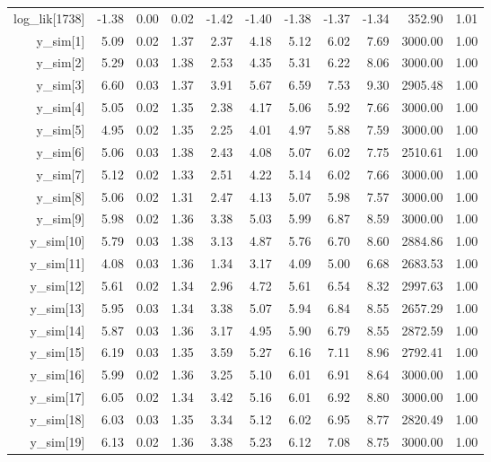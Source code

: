 \begin{table}[ht]
\begin{tabular}{rrrrrrrrrrr}
  log\_lik[1738] & -1.38 & 0.00 & 0.02 & -1.42 & -1.40 & -1.38 & -1.37 & -1.34 & 352.90 & 1.01 \\ 
  y\_sim[1] & 5.09 & 0.02 & 1.37 & 2.37 & 4.18 & 5.12 & 6.02 & 7.69 & 3000.00 & 1.00 \\ 
  y\_sim[2] & 5.29 & 0.03 & 1.38 & 2.53 & 4.35 & 5.31 & 6.22 & 8.06 & 3000.00 & 1.00 \\ 
  y\_sim[3] & 6.60 & 0.03 & 1.37 & 3.91 & 5.67 & 6.59 & 7.53 & 9.30 & 2905.48 & 1.00 \\ 
  y\_sim[4] & 5.05 & 0.02 & 1.35 & 2.38 & 4.17 & 5.06 & 5.92 & 7.66 & 3000.00 & 1.00 \\ 
  y\_sim[5] & 4.95 & 0.02 & 1.35 & 2.25 & 4.01 & 4.97 & 5.88 & 7.59 & 3000.00 & 1.00 \\ 
  y\_sim[6] & 5.06 & 0.03 & 1.38 & 2.43 & 4.08 & 5.07 & 6.02 & 7.75 & 2510.61 & 1.00 \\ 
  y\_sim[7] & 5.12 & 0.02 & 1.33 & 2.51 & 4.22 & 5.14 & 6.02 & 7.66 & 3000.00 & 1.00 \\ 
  y\_sim[8] & 5.06 & 0.02 & 1.31 & 2.47 & 4.13 & 5.07 & 5.98 & 7.57 & 3000.00 & 1.00 \\ 
  y\_sim[9] & 5.98 & 0.02 & 1.36 & 3.38 & 5.03 & 5.99 & 6.87 & 8.59 & 3000.00 & 1.00 \\ 
  y\_sim[10] & 5.79 & 0.03 & 1.38 & 3.13 & 4.87 & 5.76 & 6.70 & 8.60 & 2884.86 & 1.00 \\ 
  y\_sim[11] & 4.08 & 0.03 & 1.36 & 1.34 & 3.17 & 4.09 & 5.00 & 6.68 & 2683.53 & 1.00 \\ 
  y\_sim[12] & 5.61 & 0.02 & 1.34 & 2.96 & 4.72 & 5.61 & 6.54 & 8.32 & 2997.63 & 1.00 \\ 
  y\_sim[13] & 5.95 & 0.03 & 1.34 & 3.38 & 5.07 & 5.94 & 6.84 & 8.55 & 2657.29 & 1.00 \\ 
  y\_sim[14] & 5.87 & 0.03 & 1.36 & 3.17 & 4.95 & 5.90 & 6.79 & 8.55 & 2872.59 & 1.00 \\ 
  y\_sim[15] & 6.19 & 0.03 & 1.35 & 3.59 & 5.27 & 6.16 & 7.11 & 8.96 & 2792.41 & 1.00 \\ 
  y\_sim[16] & 5.99 & 0.02 & 1.36 & 3.25 & 5.10 & 6.01 & 6.91 & 8.64 & 3000.00 & 1.00 \\ 
  y\_sim[17] & 6.05 & 0.02 & 1.34 & 3.42 & 5.16 & 6.01 & 6.92 & 8.80 & 3000.00 & 1.00 \\ 
  y\_sim[18] & 6.03 & 0.03 & 1.35 & 3.34 & 5.12 & 6.02 & 6.95 & 8.77 & 2820.49 & 1.00 \\ 
  y\_sim[19] & 6.13 & 0.02 & 1.36 & 3.38 & 5.23 & 6.12 & 7.08 & 8.75 & 3000.00 & 1.00 \\ 

\end{tabular}
\end{table}
